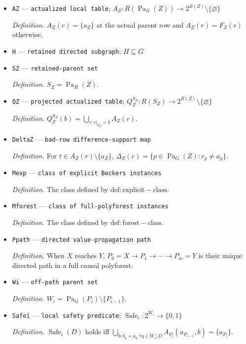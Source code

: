 \documentclass{article}
\begin{document}
\begin{itemize}
  \item \texttt{AZ} --- \texttt{actualized local table}; \(A_Z:R(\operatorname{Pa}_G(Z))\to 2^{R(Z)}\setminus\{\varnothing\}\)
  \par\smallskip\noindent\emph{Definition.} \(A_Z(r)=\{a_Z\}\) at the actual parent row and \(A_Z(r)=F_Z(r)\) otherwise.
  \item \texttt{H} --- \texttt{retained directed subgraph}; \(H\subseteq G\)
  \item \texttt{SZ} --- \texttt{retained-\allowbreak{}parent set}
  \par\smallskip\noindent\emph{Definition.} \(S_Z=\operatorname{Pa}_H(Z)\).
  \item \texttt{QZ} --- \texttt{projected actualized table}; \(Q_Z^{S_Z}:R(S_Z)\to 2^{R(Z)}\setminus\{\varnothing\}\)
  \par\smallskip\noindent\emph{Definition.} \(Q_Z^{S_Z}(b)=\bigcup_{r:r|_{S_Z}=b}A_Z(r)\).
  \item \texttt{DeltaZ} --- \texttt{bad-\allowbreak{}row difference-\allowbreak{}support map}
  \par\smallskip\noindent\emph{Definition.} For \(t\in A_Z(r)\setminus\{a_Z\}\), \(\Delta_Z(r)=\{p\in\operatorname{Pa}_G(Z):r_p\ne a_p\}\).
  \item \texttt{Mexp} --- \texttt{class of explicit Beckers instances}
  \par\smallskip\noindent\emph{Definition.} The class defined by \(\mathrm{def:explicit-class}\).
  \item \texttt{Mforest} --- \texttt{class of full-\allowbreak{}polyforest instances}
  \par\smallskip\noindent\emph{Definition.} The class defined by \(\mathrm{def:forest-class}\).
  \item \texttt{Ppath} --- \texttt{directed value-\allowbreak{}propagation path}
  \par\smallskip\noindent\emph{Definition.} When \(X\) reaches \(Y\), \(P_0=X\to P_1\to\cdots\to P_m=Y\) is their unique directed path in a full causal polyforest.
  \item \texttt{Wi} --- \texttt{off-\allowbreak{}path parent set}
  \par\smallskip\noindent\emph{Definition.} \(W_i=\operatorname{Pa}_G(P_i)\setminus\{P_{i-1}\}\).
  \item \texttt{Safei} --- \texttt{local safety predicate}; \(\operatorname{Safe}_i:2^{W_i}\to\{0,1\}\)
  \par\smallskip\noindent\emph{Definition.} \(\operatorname{Safe}_i(D)\) holds iff \(\bigcup_{b:b_q=a_q\ \forall q\in W_i\setminus D}A_{P_i}(a_{P_{i-1}},b)=\{a_{P_i}\}\).

\end{itemize}
\end{document}
